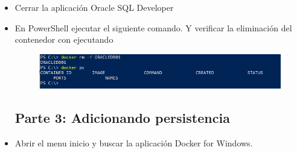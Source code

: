 \begin{itemize}
	\item Cerrar la aplicación Oracle SQL Developer
	\item En PowerShell ejecutar el siguiente comando. Y verificar la eliminación del contenedor con ejecutando
		\begin{figure}[H]
		\begin{center}
		\includegraphics[width=12cm]{./Imagenes/15}
		\end{center}
		\end{figure}


\subsection{Parte 3: Adicionando persistencia}
	\item Abrir el menu inicio y buscar la aplicación Docker for Windows.
       
\end{itemize}
		